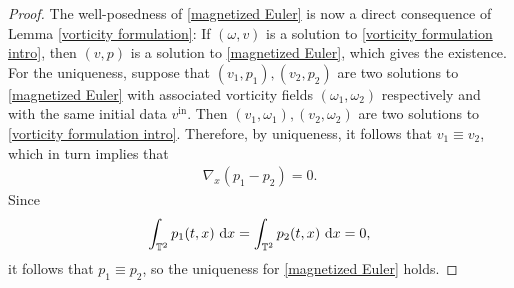 \documentclass[11pt,reqno]{amsart}
\numberwithin{equation}{section}
\def\dd{{\rm d}}
\begin{document}
\begin{proof}
The well-posedness of \eqref{magnetized Euler} is now a direct consequence of Lemma \ref{vorticity formulation}: If $(\omega,v)$ is a solution to \eqref{vorticity formulation intro}, 
then $(v,p)$ is a solution to \eqref{magnetized Euler}, which gives the existence. 
For the uniqueness, suppose that  $(v_{1},p_{1}),(v_{2},p_{2})$  are two solutions 
to \eqref{magnetized Euler} with associated vorticity fields $(\omega_{1},\omega_{2})$ respectively 
and with the same initial data $v^{\mathrm{in}}$. 
Then $(v_{1},\omega_{1}),(v_{2},\omega_{2})$ are two solutions to \eqref{vorticity formulation intro}. Therefore, by uniqueness, it follows that $v_{1}\equiv v_{2}$, which in turn implies that 
\begin{align*}
\nabla_{x}(p_{1}-p_{2})=0.   
\end{align*}
Since 
\begin{align*}
\int_{\mathbb{T}^{2}}p_{1}(t,x)\ \dd x=\int_{\mathbb{T}^{2}}p_{2}(t,x)\ \dd x=0,    
\end{align*}
it follows that $p_{1}\equiv p_{2}$, so the uniqueness for \eqref{magnetized Euler} holds.


\end{proof}
\end{document}
